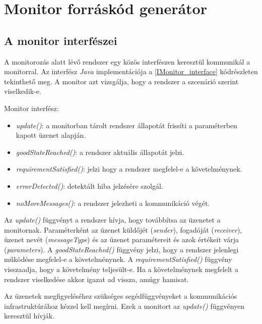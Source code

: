 \section{Monitor forráskód generátor}

\subsection{A monitor interfészei}

A monitorozás alatt lévő rendszer egy közös interfészen keresztül kommunikál a monitorral.
Az interfész \textit{Java} implementációja a \ref{IMonitor_interface} kódrészleten tekinthető meg.
A monitor azt vizsgálja, hogy a rendszer a szcenárió szerint viselkedik-e.

Monitor interfész:
\begin{itemize}
    \item \textit{update()}: a monitorban tárolt rendszer állapotát frissíti a paraméterben kapott üzenet alapján.
    \item \textit{goodStateReached()}: a rendszer aktuális állapotát jelzi.
    \item \textit{requirementSatisfied()}: jelzi hogy a rendszer megfelel-e a követelménynek.
    \item \textit{errorDetected()}: detektált hiba jelzésére szolgál.
    \item \textit{noMoreMessages()}: a rendszer jelezheti a kommunikáció végét.
\end{itemize}

Az \textit{update()} függvényt a rendszer hívja, hogy továbbítsa az üzenetet a monitornak.
Paraméterként az üzenet küldőjét (\textit{sender}), fogadóját (\textit{receiver}), üzenet nevét (\textit{messageType}) és az üzenet paramétereit és azok értékeit várja (\textit{parameters}).
A \textit{goodStateReached()} függvény jelzi, hogy a rendszer jelenlegi működése megfelel-e a követelménynek.
A \textit{requirementSatisfied()} függvény visszaadja, hogy a követelmény teljesült-e.
Ha a követelménynek megfelelt a rendszer viselkedése akkor igazat ad vissza, amúgy hamisat.

Az üzenetek megfigyeléséhez szükséges segédfüggvényeket a kommunikációs infrastruktúrához kézzel kell megírni.
Ezek a monitort az \textit{update()} függvényen keresztül hívják.

